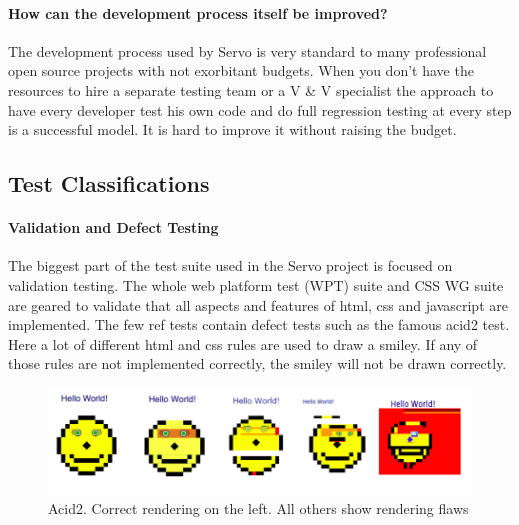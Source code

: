 \documentclass{scrartcl}
\begin{document}
\paragraph{How can the development process itself be improved?}
The development process used by Servo is very standard to many professional open source projects with not exorbitant budgets. When you don't have the resources to hire a separate testing team or a V \& V specialist the approach to have every developer test his own code and do full regression testing at every step is a successful model. It is hard to improve it without raising the budget. 


\subsection{Test Classifications}

\paragraph{Validation and Defect Testing}
The biggest part of the test suite used in the Servo project is focused on validation testing. The whole web platform test (WPT) suite and CSS WG suite are geared to validate that all aspects and features of html, css and javascript are implemented. The few ref tests contain defect tests such as the famous acid2 test. Here a lot of different html and css rules are used to draw a smiley. If any of those rules are not implemented correctly, the smiley will not be drawn correctly.

\begin{figure}[h]
    \centering
    \includegraphics[width=\textwidth]{acid2}
    \caption{Acid2. Correct rendering on the left. All others show rendering flaws}
\end{figure}
\end{document}
